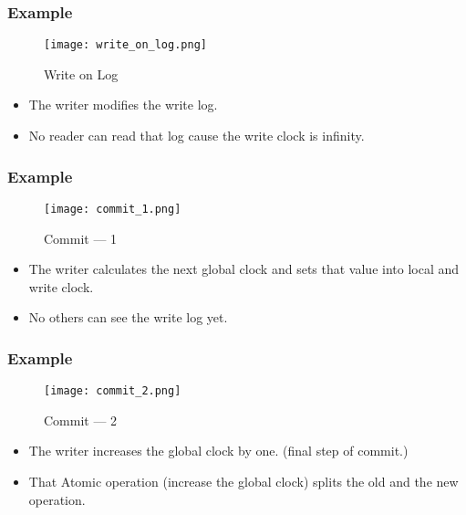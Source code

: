 \documentclass{beamer}
\begin{document}

\begin{frame}[t]
  \frametitle{Example}

  \begin{figure}[ht]
    \centering
    \texttt{[image: write\_on\_log.png]}
    \caption{Write on Log}
  \end{figure}

  \begin{itemize}
  \item The writer modifies the write log.
  \item No reader can read that log cause the write clock is infinity.
  \end{itemize}
  
\end{frame}


\begin{frame}[t]
  \frametitle{Example}

  \begin{figure}[ht]
    \centering
    \texttt{[image: commit\_1.png]}
    \caption{Commit --- 1}
  \end{figure}

  \begin{itemize}
  \item The writer calculates the next global clock and sets that value into local and write clock.
  \item No others can see the write log yet.
  \end{itemize}
  
\end{frame}


\begin{frame}[t]
  \frametitle{Example}

  \begin{figure}[ht]
    \centering
    \texttt{[image: commit\_2.png]}
    \caption{Commit --- 2}
  \end{figure}

  \begin{itemize}
  \item The writer increases the global clock by one. (final step of commit.)
  \item That Atomic operation (increase the global clock) splits the old and the new operation.
  \end{itemize}
  
\end{frame}
\end{document}
